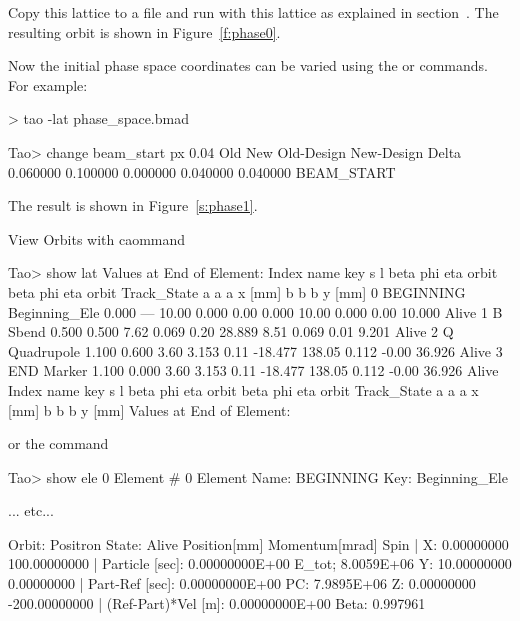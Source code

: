 \documentclass{hitec}
\begin{document}
Copy this lattice to a file and run \tao with this lattice as explained in
section~. The resulting orbit is shown in Figure~\ref{f:phase0}.


Now the initial phase space coordinates can be varied using the  or 
commands. For example:
{\small
\begin{code}
> tao -lat phase_space.bmad

Tao> change beam_start px 0.04
           Old           New    Old-Design    New-Design         Delta
      0.060000      0.100000      0.000000      0.040000      0.040000    BEAM_START
\end{code}}

The result is shown in Figure~\ref{s:phase1}.

View Orbits with  caommand

{\small
\begin{code}
Tao> show lat
      Values at End of Element:
 Index  name      key                       s       l    beta     phi    eta  orbit     beta     phi    eta  orbit    Track_State
                                                            a       a      a  x [mm]       b       b      b  y [mm]
     0  BEGINNING Beginning_Ele         0.000     ---   10.00   0.000   0.00   0.000   10.00   0.000   0.00  10.000   Alive
     1  B         Sbend                 0.500   0.500    7.62   0.069   0.20  28.889    8.51   0.069   0.01   9.201   Alive
     2  Q         Quadrupole            1.100   0.600    3.60   3.153   0.11 -18.477  138.05   0.112  -0.00  36.926   Alive
     3  END       Marker                1.100   0.000    3.60   3.153   0.11 -18.477  138.05   0.112  -0.00  36.926   Alive
 Index  name      key                       s       l    beta     phi    eta  orbit     beta     phi    eta  orbit    Track_State
                                                            a       a      a  x [mm]       b       b      b  y [mm]
      Values at End of Element:
\end{code}}

or the  command

{\small
\begin{code}
Tao> show ele 0
 Element #                0
 Element Name: BEGINNING
 Key: Beginning_Ele

... etc...

Orbit:  Positron   State: Alive
         Position[mm] Momentum[mrad]        Spin   |
  X:       0.00000000   100.00000000               | Particle [sec]:      0.00000000E+00  E_tot;  8.0059E+06
  Y:      10.00000000     0.00000000               | Part-Ref [sec]:      0.00000000E+00  PC:     7.9895E+06
  Z:       0.00000000  -200.00000000               | (Ref-Part)*Vel [m]:  0.00000000E+00  Beta:    0.997961
\end{code}}
\end{document}
